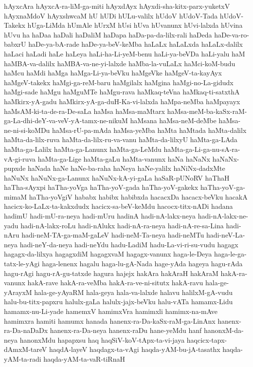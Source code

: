 {hAyxcAra
hAyxcA-ra-liM-ga-miti
hAyxdAyx
hAyxdi-sha-kitx-parx-yuketxV
hAyxnaMdoV
hAyxshwcaM
hU
hUDi
hULu-valilx
hUdoV
hUdoV-Tada
hUdoV-Takekx
hUga-LiMda
hUmAle
hUrxM
hUsi
hUva
hUvanunx
hUvi-lalxda
hUvina
hUvu
ha
haDaa
haDali
haDaliM
haDapa
haDa-pa-da-lilx-rali
haDeda
haDe-va-ro-babxrU
haDe-ya-bA-rade
haDe-ya-beV-keMba
haLaLx
haLaLxda
haLaLx-dalilx
haLaci
haLadi
haLe
haLeya
haLi-ha-Li-yeM-benu
haLi-ya-beVDa
haLi-yalu
haM
haMBA-va-dalilx
haMBA-va-ne-yi-lalxde
haMba-la-vuLaLx
haMci-koM-budu
haMcu
haMdi
haMga
haMga-Li-ya-beVku
haMgeVke
haMgeV-ta-kayAyx
haMgeV-takekx
haMgi-ga-reM-baru
haMgilalx
haMgina
haMgi-no-La-gidudx
haMgi-sade
haMgu
haMguMTe
haMgu-rava
haMkaq-teVna
haMkaq-ti-satxthA
haMkirx-yA-gadu
haMkirx-yA-ga-duH-Ka-vi-lalxda
haMpa-neMba
haMpayayx
haMsAM-ki-ta-de-ra-De-saLa
haMsa
haMsa-maMtarx
haMsa-meM-ba-kaSx-raM-ga-La-dhi-deY-va-veV-yA-tamx-ne-nikuM
haMsana
haMsa-neM-deMbe
haMsa-ne-ni-si-koMDu
haMsa-rU-pa-mAda
haMsa-yeMba
haMta
haMtada
haMta-dalilx
haMta-da-lilx-ruva
haMta-da-lilx-ru-va-vanu
haMta-da-lilxyU
haMta-ga-LAda
haMta-ga-Lalilx
haMta-ga-Lanunx
haMta-ga-LeMdu
haMta-ga-Li-ga-nu-sA-ra-vA-gi-ruva
haMta-ga-Lige
haMta-gaLu
haMta-vanunx
haNa
haNaNx
haNaNx-pupxde
haNada
haNe
haNe-ba-raha
haNeya
haNe-yalilx
haNiNx-dadxMte
haNuNx
haNuNx-ga-Lanunx
haNuNx-kA-yi-gaLa
haSaR-pUNoRV
haThaH
haTha-sAyxpi
haTha-yoVga
haTha-yoV-gada
haTha-yoV-gakekx
haTha-yoV-ga-mimaM
haTha-yoVgiV
hababx
habibx
habibxda
hacacxDa
hacacx-beVku
hacakA
hacicx-ko-LaLx-ta-kakxdudx
hacicx-sa-beV-keMdu
hacocx-titx-nADi
hadana
hadimU
hadi-mU-ra-neya
hadi-mUru
hadinA
hadi-nA-lakx-neya
hadi-nA-lakx-ne-yadu
hadi-nA-lakx-roLu
hadi-nAlukx
hadi-nA-ra-neya
hadi-nA-re-sa-Lina
hadi-nAru
hadi-neM-TA-ga-maM-gaLeV
hadi-neM-Ta-neya
hadi-neMTu
hadi-neV-La-neya
hadi-neY-da-neya
hadi-neYdu
hadu-LadiM
hadu-La-vi-ri-su-vudu
hagagx
hagagx-da-lilxya
hagagxdiM
hagagxvaM
hagagx-vanunx
haga-le-Deya
haga-le-ga-tatx-le-yAgi
haga-lenenx
hagalu
haga-lu-gA-Nada
hage-yAda
hageya
hagu-rAda
hagu-rAgi
hagu-rA-gu-tatxde
hagura
hajejx
hakAra
hakAraH
hakAraM
hakA-ra-vanunx
hakA-rave
hakA-ra-veMba
hakA-ra-ve-ni-situtx
hakA-ravu
hala-ge-yArayxM
hala-ge-yAyaRM
hala-geya
hala-va-lalxde
halavu
halilxM-gA-vudu
halu-bu-titx-papxru
halulx-gaLa
halulx-jajx-beVku
halu-vATa
hamamx-Lidu
hamamx-nu-Li-yade
hamemxV
hamimxVra
hamimxli
hamimx-na-mAve
hamimxra
hamiti
hamumx
hanada
hanenx-ra-Da-kaSx-raM-ga-LinAnx
hanenx-ra-Da-naDaDx
hanenx-ra-Da-neya
hanenx-raDu
hane-yeMdu
hanf
hanonxM-da-neya
hanonxMdu
hapapxsu
haq
haqSiV-koV-tApx-ta-vi-jaya
haqcicx-tapx-dAmxM-tareV
haqdA-layeV
haqdagx-ta-vAgi
haqda-yAM-bu-jA-tasathx
haqda-yAM-ta-radi
haqda-yAM-ta-vaR-tiRnaH
}
